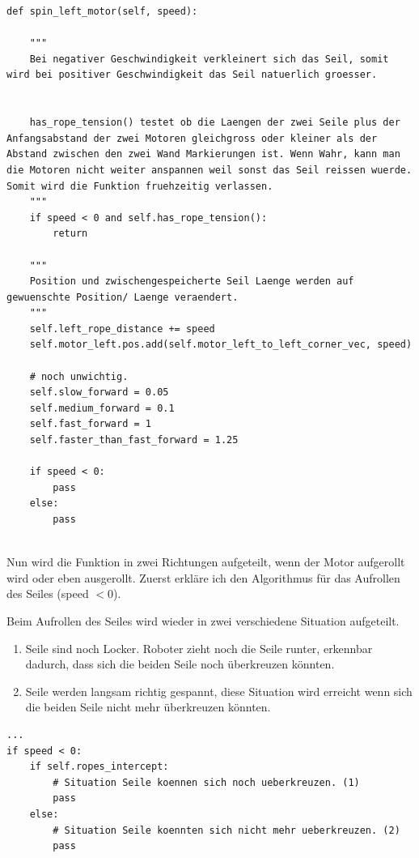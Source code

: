 \documentclass[12pt]{article}
\begin{document}
\begin{lstlisting}
def spin_left_motor(self, speed):

	""" 
	Bei negativer Geschwindigkeit verkleinert sich das Seil, somit wird bei positiver Geschwindigkeit das Seil natuerlich groesser.
	
	
	has_rope_tension() testet ob die Laengen der zwei Seile plus der Anfangsabstand der zwei Motoren gleichgross oder kleiner als der Abstand zwischen den zwei Wand Markierungen ist. Wenn Wahr, kann man die Motoren nicht weiter anspannen weil sonst das Seil reissen wuerde. Somit wird die Funktion fruehzeitig verlassen.
	"""
	if speed < 0 and self.has_rope_tension():
		return
	
	"""
	Position und zwischengespeicherte Seil Laenge werden auf gewuenschte Position/ Laenge veraendert.
	"""
	self.left_rope_distance += speed
	self.motor_left.pos.add(self.motor_left_to_left_corner_vec, speed)
	
	# noch unwichtig.
	self.slow_forward = 0.05
	self.medium_forward = 0.1
	self.fast_forward = 1
	self.faster_than_fast_forward = 1.25
	
	if speed < 0:
		pass
	else:
		pass
	
\end{lstlisting}
Nun wird die Funktion in zwei Richtungen aufgeteilt, wenn der Motor aufgerollt wird oder eben ausgerollt. Zuerst erkläre ich den Algorithmus für das Aufrollen des Seiles (speed $< 0$).

Beim Aufrollen des Seiles wird wieder in zwei verschiedene Situation aufgeteilt.
\begin{enumerate}
	\item Seile sind noch Locker. Roboter zieht noch die Seile runter, erkennbar dadurch, dass sich die beiden Seile noch überkreuzen könnten.
	\item Seile werden langsam richtig gespannt, diese Situation wird erreicht wenn sich die beiden Seile nicht mehr überkreuzen könnten.
\end{enumerate}

\begin{lstlisting}
...
if speed < 0:
	if self.ropes_intercept:
		# Situation Seile koennen sich noch ueberkreuzen. (1)
		pass
	else:
		# Situation Seile koennten sich nicht mehr ueberkreuzen. (2)
		pass
\end{lstlisting}
\end{document}
